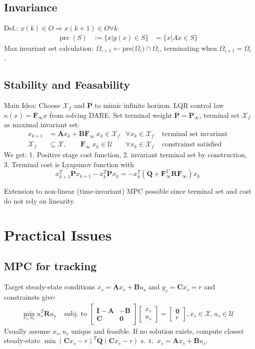 \documentclass[landscape,a4paper,8pt]{scrartcl}
\renewcommand{\implies}{\Rightarrow}
\newcommand{\mc}[1]{\mathcal{#1}}
\newcommand\vA{\bm{A}}
\newcommand\vB{\bm{B}}
\newcommand\vC{\bm{C}}
\newcommand\vF{\bm{F}}
\newcommand\vI{\bm{I}}
\newcommand\vP{\bm{P}}
\newcommand\vQ{\bm{Q}}
\newcommand\vR{\bm{R}}
\newcommand{\Me}[1]{\begin{bmatrix}#1\end{bmatrix}} %
\DeclareMathOperator\pre{pre}
\begin{document}
\begin{multicols*}{3}
\subsection{Invariance}
Def.: $x(k) \in O \implies x(k+1) \in O \forall k$. \\
\begin{align*}
\pre(S) & := \{ x | g(x) \in S\} & = \{ x | Ax \in S \}
\end{align*}
Max invariant set calculation: $\Omega_{i+1} \leftarrow \text{pre($\Omega_i$)} \cap \Omega_i$, terminating when $\Omega_{i+1} = \Omega_i$.

\subsection{Stability and Feasability}

Main Idea: Choose $\mc X_f$ and $\vP$ to mimic infinite horizon.
LQR control law $\kappa(x) = \vF_\infty x$ from solving DARE.
Set terminal weight $\vP = \vP_\infty$, terminal set $\mc X_f$ as maximal invariant set:
\begin{align*}
x_{k+1} & = \vA x_k + \vB\vF_\infty\ x_k \in \mc X_f & \forall x_k \in \mc X_f & \text{ terminal set invariant} \\
\mc X_f & \subseteq \mc X, \qquad \vF_\infty\ x_k \in \mc U & \forall x_k \in \mc X_f & \text{ constrainst satisfied}
\end{align*}
We get: 1. Positive stage cost function, 2. invariant terminal set by construction, 3. Terminal cost is Lyapunov function with
\[ x_{k+1}^T\vP x_{k+1} - x_k^T\vP x_k = -x_k^T(\vQ + \vF_\infty^T\vR\vF_\infty)x_k \]

Extension to non-linear (time-invariant) MPC possible since terminal set and cost do not rely on linearity.

\section{Practical Issues}

\subsection{MPC for tracking}
Target steady-state conditions $x_s = \vA x_s + \vB u_s$ and $y_s = \vC x_s = r$ and constrainsts give:
\begin{align*}
\min_{x_s, u_s} u_s^T \vR u_s & \text{ subj. to } \Me{\vI-\vA & -\vB \\ \vC & \bm 0}\Me{x_s \\ u_s} = \Me{\bm 0 \\ r}, x_s \in \mc X, u_s \in \mc U
\end{align*}
Usually assume $x_s, u_s$ unique and feasible.
If no solution exists, compute closest steady-state $\min (\vC x_s - r)^T \vQ (\vC x_s - r)$ s.\ t.\ $x_s = \vA x_s + \vB u_s$.



\end{multicols*}
\end{document}
